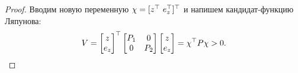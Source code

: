 \begin{proof}
	Вводим новую переменную $\chi = [z^\top \ e_z^\top ]^\top$ и напишем кандидат-функцию Ляпунова:
	\begin{equation}
		\label{eq:thm3_Lyapunov_candidat}
		V = \begin{bmatrix}
			z  \\ e_z
		\end{bmatrix}^\top
		\begin{bmatrix}
			{P}_1 & 0 \\
			0 & {P}_2
		\end{bmatrix}
		\begin{bmatrix}
			z \\
			e_z
		\end{bmatrix}
		=
		\chi^\top {P} \chi >0.
	\end{equation}
	

\end{proof}
